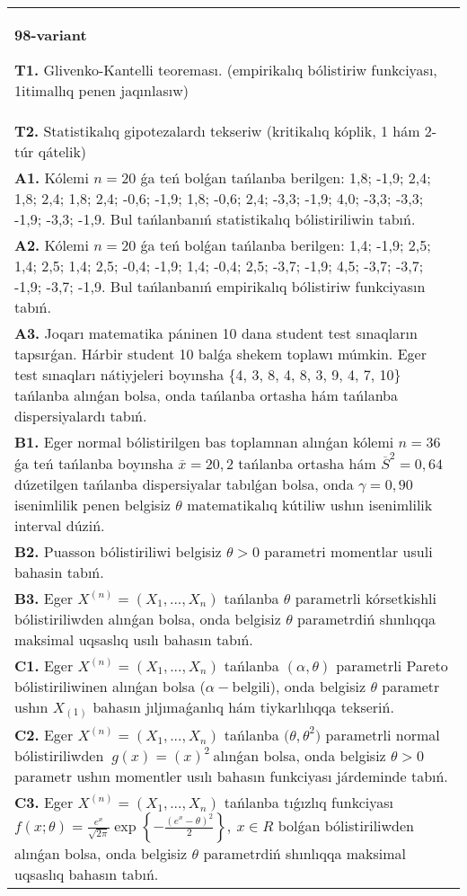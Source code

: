 \documentclass{article}
\begin{document}
\begin{tabular}{m{17cm}}
\textbf{98-variant}
\newline

\textbf{T1.} 
Glivenko-Kantelli teoreması. (empirikalıq bólistiriw funkciyası, 1itimallıq penen jaqınlasıw)
 \\
\textbf{T2.} 
Statistikalıq gipotezalardı tekseriw (kritikalıq kóplik, 1 hám 2-túr qátelik)
 \\
\textbf{A1.} 
Kólemi \(n = 20\) ǵa teń bolǵan tańlanba berilgen: 1,8; -1,9; 2,4; 1,8; 2,4; 1,8; 2,4; -0,6; -1,9; 1,8; -0,6; 2,4; -3,3; -1,9; 4,0; -3,3; -3,3; -1,9; -3,3; -1,9. Bul tańlanbanıń statistikalıq bólistiriliwin tabıń.
 \\
\textbf{A2.} 
Kólemi \(n = 20\) ǵa teń bolǵan tańlanba berilgen: 1,4; -1,9; 2,5; 1,4; 2,5; 1,4; 2,5; -0,4; -1,9; 1,4; -0,4; 2,5; -3,7; -1,9; 4,5; -3,7; -3,7; -1,9; -3,7; -1,9. Bul tańlanbanıń empirikalıq bólistiriw funkciyasın tabıń.
 \\
\textbf{A3.} 
Joqarı matematika páninen 10 dana student test sınaqların tapsırǵan. Hárbir student 10 balǵa shekem toplawı múmkin. Eger test sınaqları nátiyjeleri boyınsha \{4, 3, 8, 4, 8, 3, 9, 4, 7, 10\} tańlanba alınǵan bolsa, onda tańlanba ortasha hám tańlanba dispersiyalardı tabıń.
 \\
\textbf{B1.} 
Eger normal bólistirilgen bas toplamnan alınǵan kólemi \(n = 36\) ǵa teń tańlanba boyınsha \(\overline{x} = 20,2\) tańlanba ortasha hám \({\overline{S}}^{2} = 0,64\) dúzetilgen tańlanba dispersiyalar tabılǵan bolsa, onda \(\gamma = 0,90\) isenimlilik penen belgisiz \(\theta\) matematikalıq kútiliw ushın isenimlilik interval dúziń.
 \\
\textbf{B2.} 
Puasson bólistiriliwi belgisiz \(\theta > 0\) parametri momentlar usuli bahasin tabıń.
 \\
\textbf{B3.} 
Eger \(X^{(n)} = \left( X_{1},...,X_{n} \right)\) tańlanba \(\theta\) parametrli kórsetkishli bólistiriliwden alınǵan bolsa, onda belgisiz \(\theta\) parametrdiń shınlıqqa maksimal uqsaslıq usılı bahasın tabıń.
 \\
\textbf{C1.} 
Eger \(X^{(n)} = \left( X_{1},...,X_{n} \right)\) tańlanba \((\alpha,\theta)\) parametrli Pareto bólistiriliwinen alınǵan bolsa (\(\alpha -\)belgili), onda belgisiz \(\theta\) parametr ushın \(X_{(1)}\) bahasın jıljımaǵanlıq hám tiykarlılıqqa tekseriń.
 \\
\textbf{C2.} 
Eger \(X^{(n)} = \left( X_{1},...,X_{n} \right)\) tańlanba \({(\theta,\theta}^{2})\) parametrli normal bólistiriliwden \({\ g(x) = (x)}^{2}\ \)alınǵan bolsa, onda belgisiz \(\theta > 0\) parametr ushın momentler usılı bahasın funkciyası járdeminde tabıń.
 \\
\textbf{C3.} 
Eger \(X^{(n)} = \left( X_{1},...,X_{n} \right)\) tańlanba tıǵızlıq funkciyası
$f(x;\theta) = \frac{e^{x}}{\sqrt{2\pi}}\exp\left\{ - \frac{\left( e^{x} - \theta \right)^{2}}{2} \right\},\ x \in R$
bolǵan bólistiriliwden alınǵan bolsa, onda belgisiz \(\theta\) parametrdiń shınlıqqa maksimal uqsaslıq bahasın tabıń.
 \\

\end{tabular}
\vspace{1cm}
\end{document}

